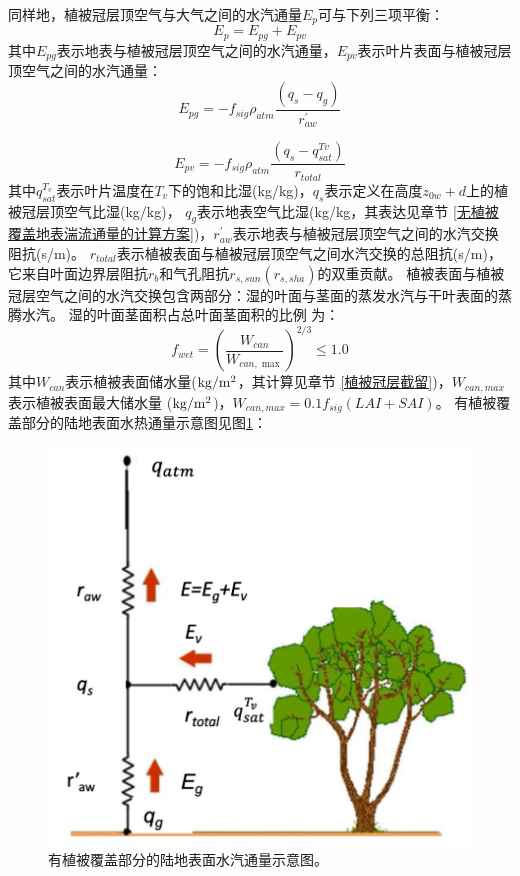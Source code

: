 同样地，植被冠层顶空气与大气之间的水汽通量$E_p$可与下列三项平衡：
\begin{equation}
E_{p}=E_{p g}+E_{p v}
\end{equation}
其中$E_{pg}$表示地表与植被冠层顶空气之间的水汽通量，$E_{pv}$表示叶片表面与植被冠层顶空气之间的水汽通量：
\begin{equation}
E_{pg}=-f_{sig} \rho_{atm} \frac{\left(q_{s}-q_{g}\right)}{r_{a w}^{\prime}}
\end{equation}

\begin{equation}
E_{pv}=-f_{sig} \rho_{atm} \frac{\left(q_{s}-q_{s a t}^{T v}\right)}{r_{t o t a l}}
\end{equation}
其中$q_{sat}^{T_v}$表示叶片温度在$T_v$下的饱和比湿(kg/kg)，$q_s$表示定义在高度$z_{0w}+d$上的植被冠层顶空气比湿(kg/kg)，
$q_g$表示地表空气比湿(kg/kg，其表达见章节 \ref{无植被覆盖地表湍流通量的计算方案})，$r_{aw}^\prime$表示地表与植被冠层顶空气之间的水汽交换阻抗(s/m)。
$r_{total}$表示植被表面与植被冠层顶空气之间水汽交换的总阻抗(s/m)，
它来自叶面边界层阻抗$r_b$和气孔阻抗$r_{s,sun}\left(r_{s,sha}\right)$的双重贡献。
植被表面与植被冠层空气之间的水汽交换包含两部分：湿的叶面与茎面的蒸发水汽与干叶表面的蒸腾水汽。
湿的叶面茎面积占总叶面茎面积的比例 \citep{dickinson1993biosphere} 为：
\begin{equation}
f_{w e t}=\left(\frac{W_{c a n}}{W_{c a n, \max }}\right)^{2 / 3} \leq 1.0
\end{equation}
其中$W_{can}$表示植被表面储水量($\rm kg/m^2$，其计算见章节 \ref{植被冠层截留})，$W_{can,max}$表示植被表面最大储水量
($\rm kg/m^2$)，$W_{can,max}=0.1f_{sig}\left(LAI+SAI\right)$。
有植被覆盖部分的陆地表面水热通量示意图见图\ref{fig:有植被覆盖部分的陆地表面水汽通量示意图}：
{
\begin{figure}[]
\centering
\includegraphics{Figures/地表湍流交换过程/有植被覆盖部分的陆地表面水汽通量示意图.png}
\caption{有植被覆盖部分的陆地表面水汽通量示意图。}
\label{fig:有植被覆盖部分的陆地表面水汽通量示意图}
\end{figure}
}
